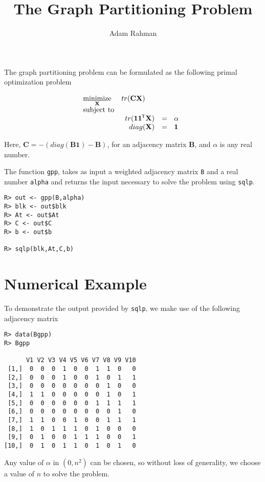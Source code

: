 \documentclass{article}
\author{Adam Rahman}
\title{The Graph Partitioning Problem}
\newcommand{\ve}[1]{\mathbf{#1}}           %
\newcommand{\m}[1]{\mathbf{#1}}               %
\newcommand{\tr}[1]{{#1}^{\mkern-1.5mu\mathsf{T}}}              %
\begin{document}
\maketitle

The graph partitioning problem can be formulated as the following primal optimization problem

\[
\begin{array}{ll}
\underset{\m{X}}{\text{minimize}} & tr(\m{C}\m{X}) \\
\text{subject to} & \\
 & \begin{array}{rl}
tr(\ve{1}\tr{\ve{1}}\m{X}) &=~~ \alpha \\
diag(\m{X}) &=~~ \ve{1}
\end{array}
\end{array}
\]

Here, $\m{C} = -(diag(\m{B}\ve{1}) - \m{B})$, for an adjacency matrix $\m{B}$, and $\alpha$ is any real number. 

The function \verb!gpp!, takes as input a weighted adjacency matrix \verb!B! and a real number \verb!alpha! and returns the input necessary to solve the problem using \verb!sqlp!.

\begin{verbatim}
R> out <- gpp(B,alpha)
R> blk <- out$blk
R> At <- out$At
R> C <- out$C
R> b <- out$b

R> sqlp(blk,At,C,b)
\end{verbatim}

\section*{Numerical Example}

To demonstrate the output provided by \verb!sqlp!, we make use of the following adjacency matrix

\begin{verbatim}
R> data(Bgpp)
R> Bgpp

      V1 V2 V3 V4 V5 V6 V7 V8 V9 V10
 [1,]  0  0  0  1  0  0  1  1  0   0
 [2,]  0  0  0  1  0  0  1  0  1   1
 [3,]  0  0  0  0  0  0  0  1  0   0
 [4,]  1  1  0  0  0  0  0  1  0   1
 [5,]  0  0  0  0  0  0  1  1  1   1
 [6,]  0  0  0  0  0  0  0  0  1   0
 [7,]  1  1  0  0  1  0  0  1  1   1
 [8,]  1  0  1  1  1  0  1  0  0   0
 [9,]  0  1  0  0  1  1  1  0  0   1
[10,]  0  1  0  1  1  0  1  0  1   0
\end{verbatim}

Any value of $\alpha$ in $(0,n^{2})$ can be chosen, so without loss of generality, we choose a value of $n$ to solve the problem.
\end{document}
